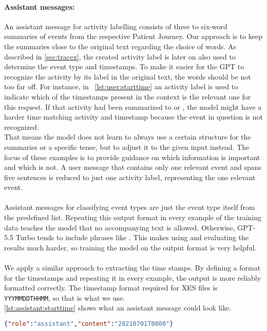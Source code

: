 \paragraph{Assistant messages:} An assistant message for activity labelling consists of three to six-word summaries of events from the respective Patient Journey. Our approach is to keep the summaries close to the original text regarding the choice of words. As described in \autoref{sec:tracex}, the created activity label is later on also used to determine the event type and timestamps. To make it easier for the GPT to recognize the activity by its label in the original text, the words should be not too far off. For instance, in ~\autoref{lst:user:starttime} an activity label is used to indicate which of the timestamps present in the context is the relevant one for this request. If that activity had been summarized to  or , the model might have a harder time matching activity and timestamp because the event in question is not recognized.\\
That means the model does not learn to always use a certain structure for the summaries or a specific tense, but to adjust it to the given input instead. The focus of these examples is to provide guidance on which information is important and which is not. A user message that contains only one relevant event and spans five sentences is reduced to just one activity label, representing the one relevant event.\\\\
Assistant messages for classifying event types are just the event type itself from the predefined list. Repeating this output format in every example of the training data teaches the model that no accompanying text is allowed. Otherwise, GPT-5.5 Turbo tends to include phrases like . This makes using and evaluating the results much harder, so training the model on the output format is very helpful. \\\\
We apply a similar approach to extracting the time stamps. By defining a format for the timestamps and repeating it in every example, the output is more reliably formatted correctly. The timestamp format required for XES files is \verb|YYYMMDDTHHMM|, so that is what we use.\\
\autoref{lst:assistant:starttime} shows what an assistant message could look like.
\begin{lstlisting}[language=json, caption={Assistant message for determining an activities start timestamp}, label={lst:assistant:starttime}]
{"role":"assistant","content":"20210701T0000"}
\end{lstlisting}

